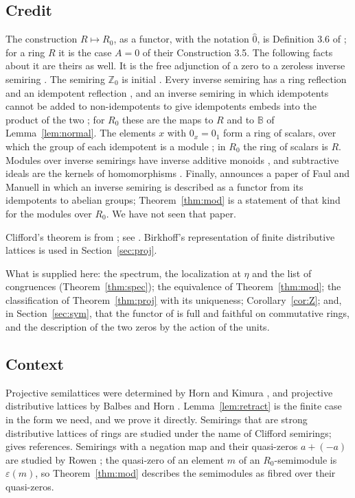\documentclass[11pt]{amsart}
\theoremstyle{remark}
\newcommand{\B}{\mathbb B}
\newcommand{\oz}{\widehat{0}}
\begin{document}
\subsection{Credit}
The construction $R\mapsto R_0$, as a functor, with the notation $\oz$, is Definition 3.6 of \cite{FGJM}; for a ring $R$ it is the case $A=0$ of their Construction 3.5. The following facts about it are theirs as well. It is the free adjunction of a zero to a zeroless inverse semiring \cite[\S3.1]{FGJM}. The semiring $\mathbb Z_0$ is initial \cite[Proposition 5.1]{FGJM}. Every inverse semiring has a ring reflection and an idempotent reflection \cite[Proposition 4.13]{FGJM}, and an inverse semiring in which idempotents cannot be added to non-idempotents to give idempotents embeds into the product of the two \cite[Theorem 7.2]{FGJM}; for $R_0$ these are the maps to $R$ and to $\B$ of Lemma~\ref{lem:normal}. The elements $x$ with $0_x=0_1$ form a ring of scalars, over which the group of each idempotent is a module \cite[Propositions 4.7 and 4.8]{FGJM}; in $R_0$ the ring of scalars is $R$. Modules over inverse semirings have inverse additive monoids \cite[Proposition 6.1]{FGJM}, and subtractive ideals are the kernels of homomorphisms \cite[Definition 6.3, Theorem 6.5]{FGJM}. Finally, \cite[\S7]{FGJM} announces a paper of Faul and Manuell \cite{FM} in which an inverse semiring is described as a functor from its idempotents to abelian groups; Theorem~\ref{thm:mod} is a statement of that kind for the modules over $R_0$. We have not seen that paper.

Clifford's theorem is from \cite{Clifford}; see \cite[Ch.~4]{Howie}. Birkhoff's representation of finite distributive lattices \cite{Birkhoff} is used in Section~\ref{sec:proj}.

What is supplied here: the spectrum, the localization at $\eta$ and the list of congruences (Theorem~\ref{thm:spec}); the equivalence of Theorem~\ref{thm:mod}; the classification of Theorem~\ref{thm:proj} with its uniqueness; Corollary~\ref{cor:Z}; and, in Section~\ref{sec:sym}, that the functor of \cite{FGJM} is full and faithful on commutative rings, and the description of the two zeros by the action of the units.

\subsection{Context}
Projective semilattices were determined by Horn and Kimura \cite{HK}, and projective distributive lattices by Balbes and Horn \cite{BH}. Lemma~\ref{lem:retract} is the finite case in the form we need, and we prove it directly. Semirings that are strong distributive lattices of rings are studied under the name of Clifford semirings; \cite[\S1]{FGJM} gives references. Semirings with a negation map and their quasi-zeros $a+(-a)$ are studied by Rowen \cite{Rowen}; the quasi-zero of an element $m$ of an $R_0$-semimodule is $\varepsilon(m)$, so Theorem~\ref{thm:mod} describes the semimodules as fibred over their quasi-zeros.
\end{document}
